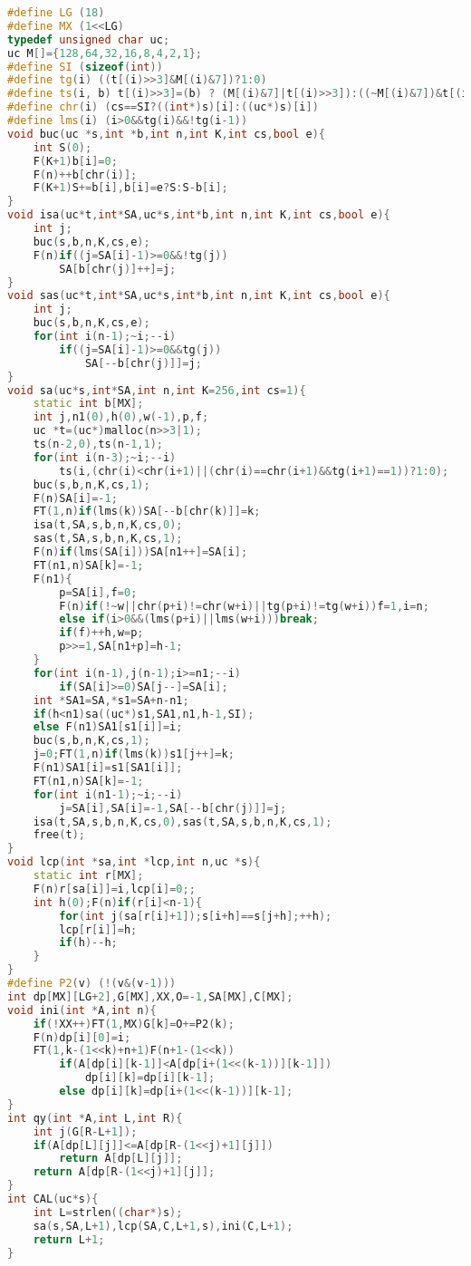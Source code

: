 \documentclass[11pt]{article}
\begin{document}
\begin{lstlisting}[language=C++]
#define LG (18)
#define MX (1<<LG)
typedef unsigned char uc;	
uc M[]={128,64,32,16,8,4,2,1};
#define SI (sizeof(int))
#define tg(i) ((t[(i)>>3]&M[(i)&7])?1:0)
#define ts(i, b) t[(i)>>3]=(b) ? (M[(i)&7]|t[(i)>>3]):((~M[(i)&7])&t[(i)>>3])
#define chr(i) (cs==SI?((int*)s)[i]:((uc*)s)[i])
#define lms(i) (i>0&&tg(i)&&!tg(i-1))
void buc(uc *s,int *b,int n,int K,int cs,bool e){
    int S(0);
    F(K+1)b[i]=0;
    F(n)++b[chr(i)];
    F(K+1)S+=b[i],b[i]=e?S:S-b[i];
}
void isa(uc*t,int*SA,uc*s,int*b,int n,int K,int cs,bool e){
    int j;
    buc(s,b,n,K,cs,e);
    F(n)if((j=SA[i]-1)>=0&&!tg(j))
        SA[b[chr(j)]++]=j;
}
void sas(uc*t,int*SA,uc*s,int*b,int n,int K,int cs,bool e){
    int j;
    buc(s,b,n,K,cs,e);
    for(int i(n-1);~i;--i)
        if((j=SA[i]-1)>=0&&tg(j))
            SA[--b[chr(j)]]=j;
}
void sa(uc*s,int*SA,int n,int K=256,int cs=1){
    static int b[MX];
    int j,n1(0),h(0),w(-1),p,f;
    uc *t=(uc*)malloc(n>>3|1);
    ts(n-2,0),ts(n-1,1);
    for(int i(n-3);~i;--i)
        ts(i,(chr(i)<chr(i+1)||(chr(i)==chr(i+1)&&tg(i+1)==1))?1:0);
    buc(s,b,n,K,cs,1);
    F(n)SA[i]=-1;
    FT(1,n)if(lms(k))SA[--b[chr(k)]]=k;
    isa(t,SA,s,b,n,K,cs,0);
    sas(t,SA,s,b,n,K,cs,1);
    F(n)if(lms(SA[i]))SA[n1++]=SA[i];
    FT(n1,n)SA[k]=-1;
    F(n1){
        p=SA[i],f=0;
        F(n)if(!~w||chr(p+i)!=chr(w+i)||tg(p+i)!=tg(w+i))f=1,i=n;
        else if(i>0&&(lms(p+i)||lms(w+i)))break;
        if(f)++h,w=p;
        p>>=1,SA[n1+p]=h-1;
    }
    for(int i(n-1),j(n-1);i>=n1;--i)
        if(SA[i]>=0)SA[j--]=SA[i];
    int *SA1=SA,*s1=SA+n-n1;
    if(h<n1)sa((uc*)s1,SA1,n1,h-1,SI);
    else F(n1)SA1[s1[i]]=i;
    buc(s,b,n,K,cs,1);
    j=0;FT(1,n)if(lms(k))s1[j++]=k;
    F(n1)SA1[i]=s1[SA1[i]];
    FT(n1,n)SA[k]=-1;
    for(int i(n1-1);~i;--i)
        j=SA[i],SA[i]=-1,SA[--b[chr(j)]]=j;
    isa(t,SA,s,b,n,K,cs,0),sas(t,SA,s,b,n,K,cs,1);
    free(t);
}
void lcp(int *sa,int *lcp,int n,uc *s){
    static int r[MX];
    F(n)r[sa[i]]=i,lcp[i]=0;;
    int h(0);F(n)if(r[i]<n-1){
        for(int j(sa[r[i]+1]);s[i+h]==s[j+h];++h);
        lcp[r[i]]=h;
        if(h)--h;
    }
}
#define P2(v) (!(v&(v-1)))
int dp[MX][LG+2],G[MX],XX,O=-1,SA[MX],C[MX];
void ini(int *A,int n){
    if(!XX++)FT(1,MX)G[k]=O+=P2(k);
    F(n)dp[i][0]=i;
    FT(1,k-(1<<k)+n+1)F(n+1-(1<<k))
        if(A[dp[i][k-1]]<A[dp[i+(1<<(k-1))][k-1]])
            dp[i][k]=dp[i][k-1];
        else dp[i][k]=dp[i+(1<<(k-1))][k-1];
}
int qy(int *A,int L,int R){
    int j(G[R-L+1]);
    if(A[dp[L][j]]<=A[dp[R-(1<<j)+1][j]])
        return A[dp[L][j]];
    return A[dp[R-(1<<j)+1][j]];
}
int CAL(uc*s){
    int L=strlen((char*)s);
    sa(s,SA,L+1),lcp(SA,C,L+1,s),ini(C,L+1);
    return L+1;
}
\end{lstlisting}
\end{document}
